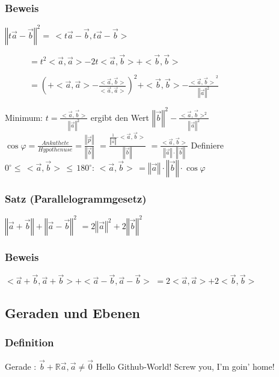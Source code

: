 \subsubsection{Beweis}
$\left\Vert t\vec{a} - \vec{b}\right\Vert^{2} = \, <t\vec{a} - \vec{b}, t\vec{a} - \vec{b}>$
\begin{description}
 \item [\tab] $ = t^{2}<\vec{a}, \vec{a}> - 2t<\vec{a}, \vec{b}> + <\vec{b}, \vec{b}>$
 \item [\tab] $ = \left(+ <\vec{a},\vec{a}> - \frac{<\vec{a}, \vec{b}>}{<\vec{a}, \vec{a}>}\right)^{2}
 + <\vec{b}, \vec{b}> - \frac{<{\vec{a}, \vec{b}>}^2}{\left\Vert\vec{a}\right\Vert^{2}}$
\end{description}
Minimum: $ t = \frac{<\vec{a}, \vec{b}>}{\left\Vert\vec{a}\right\Vert^2}$
ergibt den Wert $\left\Vert\vec{b}\right\Vert^2 - \frac{<\vec{a}, \vec{b}>^2}{\left\Vert\vec{a}\right\Vert^2}$\\
$\cos\varphi = \frac{Ankathete}{Hypothenuse} = \frac{\left\Vert\vec{p}\right\Vert}{\left\Vert\vec{b}\right\Vert}$
$= \frac{\frac{1}{\left\Vert\vec{a}\right\Vert}\cdot<\vec{a}, \vec{b}>}{\left\Vert\vec{b}\right\Vert}$
$= \frac{<\vec{a}, \vec{b}>}{\left\Vert\vec{a}\right\Vert\cdot\left\Vert\vec{b}\right\Vert}$
Definiere $0^{\circ}\leq\, <\vec{a}, \vec{b}>\, \leq\,  180^{\circ} :\, <\vec{a}, \vec{b}>\, = \left\Vert\vec{a}\right\Vert\cdot\left\Vert\vec{b}\right\Vert\cdot\cos\varphi$
%
%
%
\subsubsection{Satz (Parallelogrammgesetz)}
%
%
$\left\Vert\vec{a} + \vec{b}\right\Vert + \left\Vert\vec{a} - \vec{b}\right\Vert^{2}$
$= 2\left\Vert\vec{a}\right\Vert^2 + 2\left\Vert\vec{b}\right\Vert^2$
%
%
%
\subsubsection{Beweis}
$<\vec{a} + \vec{b}, \vec{a} + \vec{b}> + <\vec{a} -\vec{b}, \vec{a} - \vec{b}>$
$= 2<\vec{a}, \vec{a}> + 2<\vec{b}, \vec{b}>$
%
%
%
\subsection{Geraden und Ebenen}
\subsubsection{Definition}
Gerade : $\vec{b} + \mathbb{R}\vec{a}, \vec{a}\neq\vec{0}$
%
%
%
Hello Github-World!
Screw you, I'm goin' home!
%
%
%